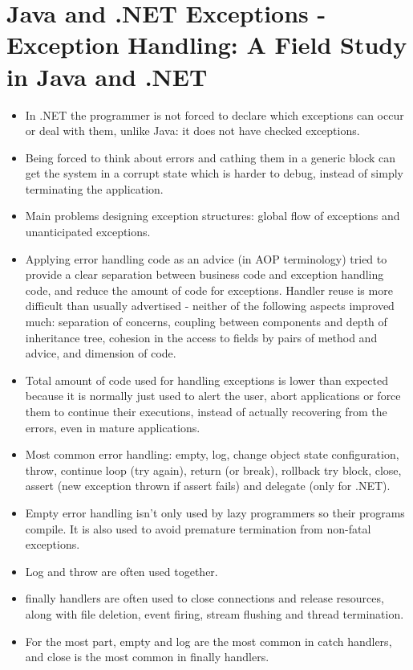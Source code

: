 \documentclass[a4paper,11pt]{article}
\theoremstyle{plain}
\theoremstyle{nonumberplain}
\begin{document}
\section{Java and .NET Exceptions - Exception Handling: A Field Study in Java and .NET}

\begin{itemize}
  \item In .NET the programmer is not forced to declare which exceptions can occur or deal with them, unlike Java: it does not have checked exceptions.
  \item Being forced to think about errors and cathing them in a generic block can get the system in a corrupt state which is harder to debug, instead of simply terminating the application.
  \item Main problems designing exception structures: global flow of exceptions and unanticipated exceptions.
  \item Applying error handling code as an advice (in AOP terminology) tried to provide a clear separation between business code and exception handling code, and reduce the amount of code for exceptions. Handler reuse is more difficult than usually advertised - neither of the following aspects improved much: separation of concerns, coupling between components and depth of inheritance tree, cohesion in the access to fields by pairs of method and advice, and dimension of code.
  \item Total amount of code used for handling exceptions is lower than expected because it is normally just used to alert the user, abort applications or force them to continue their executions, instead of actually recovering from the errors, even in mature applications.
  \item Most common error handling: empty, log, change object state configuration, throw, continue loop (try again), return (or break), rollback try block, close, assert (new exception thrown if assert fails) and delegate (only for .NET).
  \item Empty error handling isn't only used by lazy programmers so their programs compile. It is also used to avoid premature termination from non-fatal exceptions.
  \item Log and throw are often used together.
  \item finally handlers are often used to close connections and release resources, along with file deletion, event firing, stream flushing and thread termination.
  \item For the most part, empty and log are the most common in catch handlers, and close is the most common in finally handlers.

\end{itemize}
\end{document}

